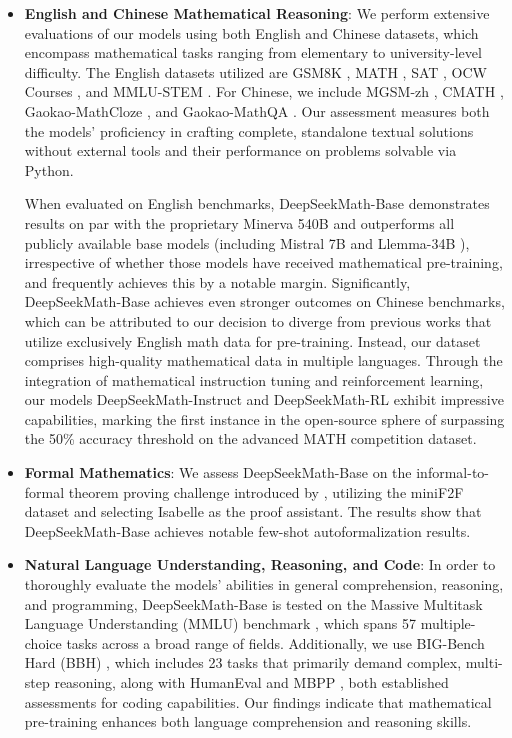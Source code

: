 \begin{itemize}[topsep=0pt]
    \item \textbf{English and Chinese Mathematical Reasoning}: We perform extensive evaluations of our models using both English and Chinese datasets, which encompass mathematical tasks ranging from elementary to university-level difficulty. The English datasets utilized are GSM8K \citep{gsm8k}, MATH \citep{MATH}, SAT \citep{llemma}, OCW Courses \citep{minerva}, and MMLU-STEM \citep{mmlu}. For Chinese, we include MGSM-zh \citep{mgsm}, CMATH \citep{wei2023cmath}, Gaokao-MathCloze \citep{agieval}, and Gaokao-MathQA \citep{agieval}. Our assessment measures both the models' proficiency in crafting complete, standalone textual solutions without external tools and their performance on problems solvable via Python.

When evaluated on English benchmarks, DeepSeekMath-Base demonstrates results on par with the proprietary Minerva 540B \citep{minerva} and outperforms all publicly available base models (including Mistral 7B \citep{mistral} and Llemma-34B \citep{llemma}), irrespective of whether those models have received mathematical pre-training, and frequently achieves this by a notable margin. Significantly, DeepSeekMath-Base achieves even stronger outcomes on Chinese benchmarks, which can be attributed to our decision to diverge from previous works \citep{minerva,llemma} that utilize exclusively English math data for pre-training. Instead, our dataset comprises high-quality mathematical data in multiple languages. Through the integration of mathematical instruction tuning and reinforcement learning, our models DeepSeekMath-Instruct and DeepSeekMath-RL exhibit impressive capabilities, marking the first instance in the open-source sphere of surpassing the 50\% accuracy threshold on the advanced MATH competition dataset.

\item \textbf{Formal Mathematics}: We assess DeepSeekMath-Base on the informal-to-formal theorem proving challenge introduced by \citep{dsp_proof}, utilizing the miniF2F dataset \citep{minif2f} and selecting Isabelle \citep{isabelle} as the proof assistant. The results show that DeepSeekMath-Base achieves notable few-shot autoformalization results.
\item \textbf{Natural Language Understanding, Reasoning, and Code}: In order to thoroughly evaluate the models’ abilities in general comprehension, reasoning, and programming, DeepSeekMath-Base is tested on the Massive Multitask Language Understanding (MMLU) benchmark \citep{mmlu}, which spans 57 multiple-choice tasks across a broad range of fields. Additionally, we use BIG-Bench Hard (BBH) \citep{bbh}, which includes 23 tasks that primarily demand complex, multi-step reasoning, along with HumanEval \citep{codex} and MBPP \citep{mbpp}, both established assessments for coding capabilities. Our findings indicate that mathematical pre-training enhances both language comprehension and reasoning skills.


\end{itemize}
